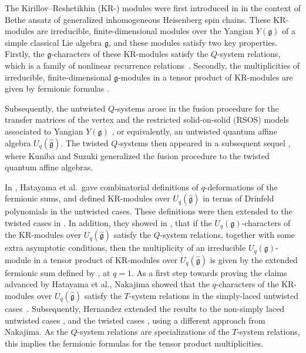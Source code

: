 \documentclass[pdftex]{sigma}
\numberwithin{equation}{section}
\begin{document}
The Kirillov--Reshetikhin (KR-) modules were first introduced in \cite{KR87} in the context of Bethe ansatz of generalized inhomogeneous Heisenberg spin chains. These KR-modules are irreducible, finite-dimensional modules over the Yangian $Y(\mathfrak{g})$ of a simple classical Lie algebra $\mathfrak{g}$, and these modules satisfy two key properties. Firstly, the $\mathfrak{g}$-characters of these KR-modules satisfy the $Q$-system relations, which is a family of nonlinear recurrence relations~\cite{Kirillov89,KR87}. Secondly, the multiplicities of irreducible, finite-dimensional $\mathfrak{g}$-modules in a tensor product of KR-modules are given by fermionic formulas \cite{KR87}.

Subsequently, the untwisted $Q$-systems arose in the fusion procedure for the transfer matrices of the vertex and the restricted solid-on-solid (RSOS) models associated to Yangian $Y(\mathfrak{g})$ \cite{KNS94}, or equivalently, an untwisted quantum affine algebra $U_q(\widehat{\mathfrak{g}})$. The twisted $Q$-systems then appeared in a subsequent sequel \cite{KS95}, where Kuniba and Suzuki generalized the fusion procedure to the twisted quantum affine algebras.

In \cite{HKOTY99}, Hatayama et al.\ gave combinatorial definitions of $q$-deformations of the fermionic sums, and defined KR-modules over $U_q(\widehat{\mathfrak{g}})$ in terms of Drinfeld polynomials \cite{Chari01} in the untwisted cases. These definitions were then extended to the twisted cases in \cite{HKOTT02}. In addition, they showed in \cite[Theorem~8.1]{HKOTY99}, \cite[Theorem 6.3]{HKOTT02} that if the $U_q(\mathfrak{g})$-characters of the KR-modules over $U_q(\widehat{\mathfrak{g}})$ satisfy the $Q$-system relations, together with some extra asymptotic conditions, then the multiplicity of an irreducible $U_q(\mathfrak{g})$-module in a tensor product of KR-modules over $U_q(\widehat{\mathfrak{g}})$ is given by the extended fermionic sum defined by \cite[equation~(4.16)]{HKOTY99}, \cite[equation~(4.20)]{HKOTT02} at $q=1$. As a first step towards proving the claims advanced by Hatayama et al., Nakajima showed that the $q$-characters of the KR-modules over $U_q(\widehat{\mathfrak{g}})$ satisfy the $T$-system relations in the simply-laced untwisted cases~\cite{Nakajima03}. Subsequently, Hernandez extended the results to the non-simply laced untwisted cases \cite{Hernandez06}, and the twisted cases \cite{Hernandez10}, using a different approach from Nakajima. As the $Q$-system relations are specializations of the $T$-system relations, this implies the fermionic formulas for the tensor product multiplicities.
\end{document}
